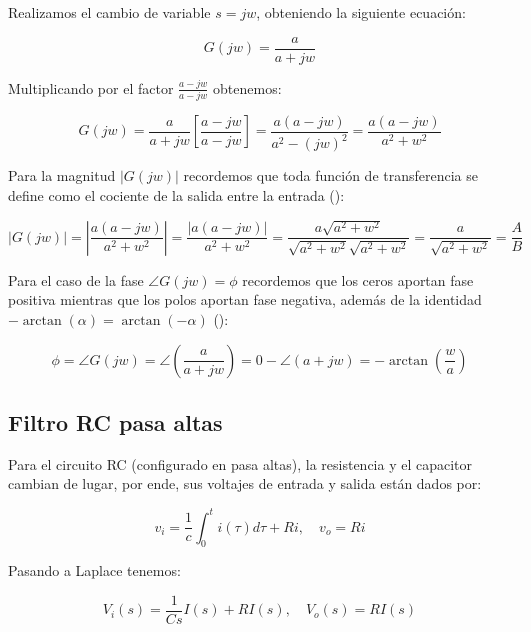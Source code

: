 \documentclass{article}
\begin{document}
Realizamos el cambio de variable $s = jw$, obteniendo la siguiente ecuación:

\begin{equation}
    G(jw)  = \frac{a}{a+jw} 
\end{equation}

Multiplicando por el factor $\frac{a-jw}{a-jw}$ obtenemos: 

\begin{equation}
    G(jw) = \frac{a}{a+jw}\left[\frac{a-jw}{a-jw}\right] = \frac{a(a-jw)}{a^2-(jw)^2} = \frac{a(a-jw)}{a^2+w^2}
\end{equation}

Para la magnitud $|G(jw)|$ recordemos que toda función de transferencia se define como el cociente de la salida entre la entrada (\cite{notasclase}): 

\begin{equation}
    |G(jw)| = \left|\frac{a(a-jw)}{a^2+w^2}\right| = \frac{|a(a-jw)|}{a^2+w^2} = \frac{a\sqrt{a^2+w^2}}{\sqrt{a^2+w^2}\sqrt{a^2+w^2}} = \frac{a}{\sqrt{a^2+w^2}} = \frac{A}{B}
    \label{eq:Magnitud_pb}
\end{equation}

Para el caso de la fase $\angle G(jw) = \phi$ recordemos que los ceros aportan fase positiva mientras que los polos aportan fase negativa, además de la identidad $-\arctan(\alpha) = \arctan(-\alpha)$ (\cite{notasclase}):

\begin{equation}
    \phi = \angle G(jw) = \angle \left(\frac{a}{a+jw}\right) = 0-\angle (a+jw) = -\arctan\left(\frac{w}{a}\right)
    \label{eq:fase_pb}
\end{equation}

\subsection{Filtro RC pasa altas}
Para el circuito RC (configurado en pasa altas), la resistencia y el capacitor cambian de lugar, por ende, sus voltajes de entrada y salida están dados por: 

\begin{equation}
    v_i = \frac{1}{c}\int_{0}^{t}i(\tau)d\tau+Ri, \quad v_o = Ri
\end{equation}

Pasando a Laplace tenemos: 

\begin{equation}
    V_i (s) = \frac{1}{Cs}I(s) + RI(s), \quad V_o(s) = RI(s)
\end{equation}
\end{document}
